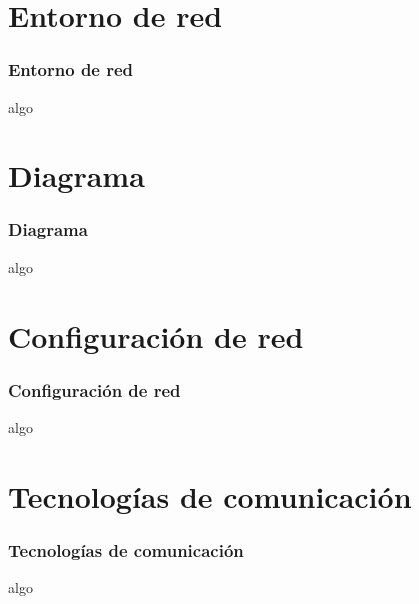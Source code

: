 










  
\section{Entorno de red}
  \begin{frame}
    \frametitle{Entorno de red}
    algo
  \end{frame}
\section{Diagrama}
  \begin{frame}
    \frametitle{Diagrama}
    algo
  \end{frame}
\section{Configuraci\'on de red}
  \begin{frame}
    \frametitle{Configuraci\'on de red}
    algo
  \end{frame}
\section{Tecnolog\'ias de comunicaci\'on}
  \begin{frame}
    \frametitle{Tecnolog\'ias de comunicaci\'on}
    algo
  \end{frame}
